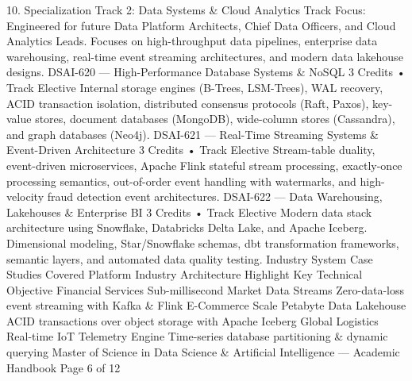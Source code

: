 10. Specialization Track 2: Data Systems \& Cloud Analytics
Track Focus: Engineered for future Data Platform Architects, Chief Data Officers, and Cloud Analytics Leads.
Focuses on high-throughput data pipelines, enterprise data warehousing, real-time event streaming
architectures, and modern data lakehouse designs.
DSAI-620 — High-Performance Database Systems \& NoSQL
3 Credits • Track Elective
Internal storage engines (B-Trees, LSM-Trees), WAL recovery, ACID transaction isolation, distributed consensus
protocols (Raft, Paxos), key-value stores, document databases (MongoDB), wide-column stores (Cassandra), and
graph databases (Neo4j).
DSAI-621 — Real-Time Streaming Systems \& Event-Driven Architecture
3 Credits • Track Elective
Stream-table duality, event-driven microservices, Apache Flink stateful stream processing, exactly-once
processing semantics, out-of-order event handling with watermarks, and high-velocity fraud detection event
architectures.
DSAI-622 — Data Warehousing, Lakehouses \& Enterprise BI
3 Credits • Track Elective
Modern data stack architecture using Snowflake, Databricks Delta Lake, and Apache Iceberg. Dimensional
modeling, Star/Snowflake schemas, dbt transformation frameworks, semantic layers, and automated data
quality testing.
Industry System Case Studies Covered
Platform Industry
Architecture Highlight
Key Technical Objective
Financial Services
Sub-millisecond Market Data Streams
Zero-data-loss event streaming with Kafka \& Flink
E-Commerce Scale
Petabyte Data Lakehouse
ACID transactions over object storage with Apache Iceberg
Global Logistics
Real-time IoT Telemetry Engine
Time-series database partitioning \& dynamic querying
Master of Science in Data Science \& Artificial Intelligence — Academic Handbook
Page 6 of 12

